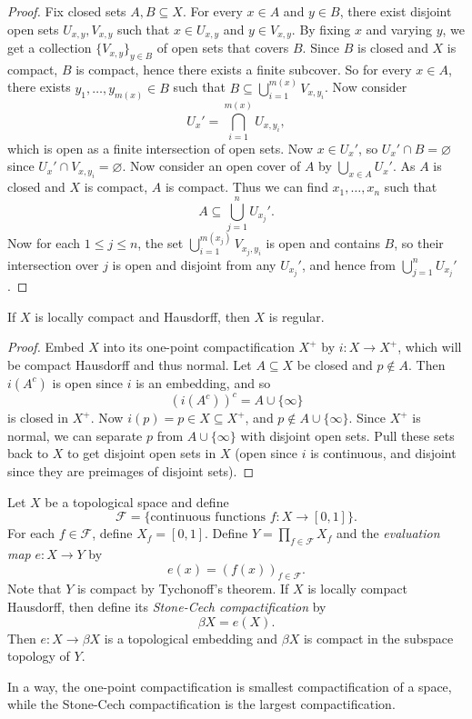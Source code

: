 \begin{proof}
  Fix closed sets $A, B \subseteq X$.
  For every
  $x \in A$ and $y \in B$, there
  exist disjoint open sets
  $U_{x, y}, V_{x, y}$
  such that $x \in U_{x, y}$ and $y \in V_{x, y}$.
  By fixing $x$ and varying $y$, we get a
  collection $\{V_{x, y}\}_{y \in B}$ of open sets
  that covers $B$. Since $B$ is closed and
  $X$ is compact, $B$ is compact, hence there
  exists a finite subcover. So for every $x \in A$,
  there exists $y_1, \dots, y_{m(x)} \in B$
  such that $B \subseteq \bigcup_{i = 1}^{m(x)} V_{x, y_i}$.
  Now consider
  \[
    U_x' = \bigcap_{i = 1}^{m(x)} U_{x, y_i},
  \]
  which is open as a finite intersection of open sets.
  Now $x \in U_x'$, so
  $U_x' \cap B = \varnothing$ since $U_x' \cap V_{x, y_i} = \varnothing$.
  Now consider an open cover of $A$ by $\bigcup_{x \in A} U_x'$.
  As $A$ is closed and $X$ is compact,
  $A$ is compact. Thus we can find $x_1, \dots, x_n$
  such that
  \[
    A \subseteq \bigcup_{j = 1}^n U_{x_j}'.
  \]
  Now for each $1 \le j \le n$, the set $\bigcup_{i = 1}^{m(x_j)} V_{x_j, y_i}$
  is open and contains $B$, so their intersection
  over $j$ is open and disjoint
  from any $U_{x_j}'$, and hence from
  $\bigcup_{j = 1}^n U_{x_j}'$.
\end{proof}

\begin{exercise}
  If $X$ is locally compact and Hausdorff, then
  $X$ is regular.
\end{exercise}

\begin{proof}
  Embed $X$ into its one-point compactification
  $X^+$ by $i : X \to X^+$, which will be compact Hausdorff and thus
  normal.
  Let $A \subseteq X$ be closed and $p \notin A$.
  Then $i(A^c)$ is open since $i$ is an embedding,
  and so
  \[
  (i(A^c))^c = A \cup \{\infty\}
  \]
  is closed in $X^+$. Now $i(p) = p \in X \subseteq X^+$,
  and $p \notin A \cup \{\infty\}$.
  Since $X^+$ is normal, we can separate $p$
  from $A \cup \{\infty\}$ with disjoint open sets.
  Pull these sets back to $X$ to get disjoint open
  sets in $X$ (open since $i$ is continuous, and
  disjoint since they are preimages of disjoint
  sets).
\end{proof}

\begin{exercise}
  Let $X$ be a topological space and define
  \[
    \mathcal{F} = \{\text{continuous functions } f : X \to [0, 1]\}.
  \]
  For each $f \in \mathcal{F}$, define
  $X_f = [0, 1]$. Define $Y = \prod_{f \in \mathcal{F}} X_f$
  and the \emph{evaluation map} $e : X \to Y$ by
  \[
    e(x) = (f(x))_{f \in \mathcal{F}}.
  \]
  Note that $Y$ is compact by Tychonoff's theorem.
  If $X$ is locally compact Hausdorff, then define
  its \emph{Stone-Cech compactification} by
  \[
    \beta X = e(X).
  \]
  Then $e : X \to \beta X$ is a topological
  embedding and $\beta X$ is compact in the
  subspace topology of $Y$.
\end{exercise}

\begin{remark}
  In a way, the one-point compactification is
  smallest compactification of a space, while the
  Stone-Cech
  compactification is the largest compactification.
\end{remark}
